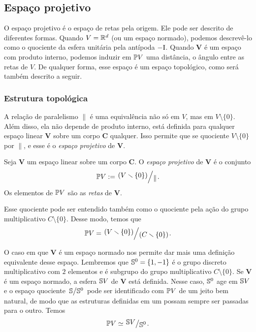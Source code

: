 













\cleardoublepage


\subsection{Espaço projetivo}

O espaço projetivo é o espaço de retas pela origem. Ele pode ser descrito de diferentes formas. Quando $V=\R^d$ (ou um espaço normado), podemos descrevê-lo como o quociente da esfera unitária pela antípoda $-\Id$. Quando $\bm V$ é um espaço com produto interno, podemos induzir em $\pro V$ uma distância, o ângulo entre as retas de $V$. De qualquer forma, esse espaço é um espaço topológico, como será também descrito a seguir.

\subsubsection{Estrutura topológica}

A relação de paralelismo $\parallel$ é uma equivalência não só em $V$, mas em $V \setminus \{0\}$. Além disso, ela não depende de produto interno, está definida para qualquer espaço linear $\bm V$ sobre um corpo $\bm C$ qualquer. Isso permite que se quociente $V \setminus \{0\}$ por $\parallel$, e esse é o \textit{espaço projetivo} de $\bm V$.

\begin{definition}
Seja $\bm V$ um espaço linear sobre um corpo $\bm C$. O \emph{espaço projetivo} de $\bm V$ é o conjunto
	\begin{equation*}
	\pro V := \quo{\left( V \setminus \{0\} \right)}{\parallel}.
	\end{equation*}
Os elementos de $\pro V$ são as \emph{retas} de $\bm V$.
\end{definition}

Esse quociente pode ser entendido também como o quociente pela ação do grupo multiplicativo $C \setminus \{0\}$. Desse modo, temos que
	\begin{equation*}
	\pro V = \quo{\left( V \setminus \{0\} \right)}{(C \setminus \{0\})}.
	\end{equation*}

O caso em que $\bm V$ é um espaço normado nos permite dar mais uma definição equivalente desse espaço. Lembremos que $\S^0 = \{1,-1\}$ é o grupo discreto multiplicativo com $2$ elementos e é subgrupo do grupo multiplicativo $C \setminus \{0\}$. Se $\bm V$ é um espaço normado, a esfera $\S V$ de $\bm V$ está definida. Nesse caso, $\S^0$ age em $\S V$ e o espaço quociente $\quo{\S}{\S^0}$ pode ser identificado com $\pro V$ de um jeito bem natural, de modo que as estruturas definidas em um possam sempre ser passadas para o outro. Temos
	\begin{equation*}
	\pro V \simeq \quo{\S V}{\S^0}.
	\end{equation*}

